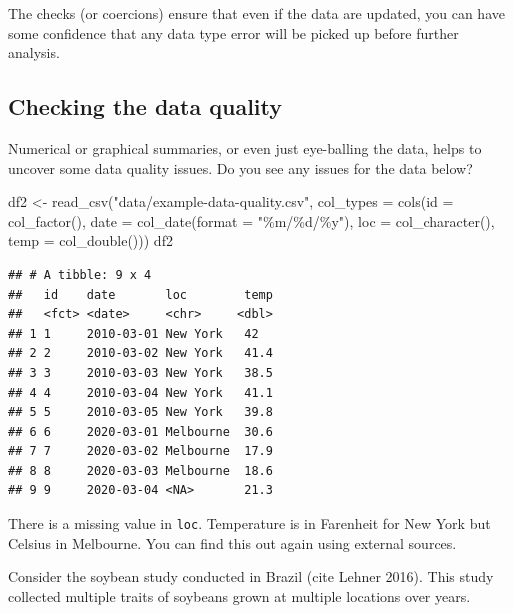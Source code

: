 \documentclass[
]{book}
\newenvironment{Shaded}{\begin{snugshade}}{\end{snugshade}}
\newcommand{\AttributeTok}[1]{\textcolor[rgb]{0.77,0.63,0.00}{#1}}
\newcommand{\FunctionTok}[1]{\textcolor[rgb]{0.00,0.00,0.00}{#1}}
\newcommand{\NormalTok}[1]{#1}
\newcommand{\OtherTok}[1]{\textcolor[rgb]{0.56,0.35,0.01}{#1}}
\newcommand{\StringTok}[1]{\textcolor[rgb]{0.31,0.60,0.02}{#1}}
\begin{document}
The checks (or coercions) ensure that even if the data are updated, you can have some confidence that any data type error will be picked up before further analysis.

\hypertarget{checking-the-data-quality}{%
\subsection{Checking the data quality}\label{checking-the-data-quality}}

Numerical or graphical summaries, or even just eye-balling the data, helps to uncover some data quality issues. Do you see any issues for the data below?

\begin{Shaded}
\begin{Highlighting}[]
\NormalTok{df2 }\OtherTok{\textless{}{-}} \FunctionTok{read\_csv}\NormalTok{(}\StringTok{"data/example{-}data{-}quality.csv"}\NormalTok{,}
                \AttributeTok{col\_types =} \FunctionTok{cols}\NormalTok{(}\AttributeTok{id =} \FunctionTok{col\_factor}\NormalTok{(),}
                                 \AttributeTok{date =} \FunctionTok{col\_date}\NormalTok{(}\AttributeTok{format =} \StringTok{"\%m/\%d/\%y"}\NormalTok{),}
                                 \AttributeTok{loc =} \FunctionTok{col\_character}\NormalTok{(),}
                                 \AttributeTok{temp =} \FunctionTok{col\_double}\NormalTok{()))}
\NormalTok{df2}
\end{Highlighting}
\end{Shaded}

\begin{verbatim}
## # A tibble: 9 x 4
##   id    date       loc        temp
##   <fct> <date>     <chr>     <dbl>
## 1 1     2010-03-01 New York   42  
## 2 2     2010-03-02 New York   41.4
## 3 3     2010-03-03 New York   38.5
## 4 4     2010-03-04 New York   41.1
## 5 5     2010-03-05 New York   39.8
## 6 6     2020-03-01 Melbourne  30.6
## 7 7     2020-03-02 Melbourne  17.9
## 8 8     2020-03-03 Melbourne  18.6
## 9 9     2020-03-04 <NA>       21.3
\end{verbatim}

There is a missing value in \texttt{loc}. Temperature is in Farenheit for New York but Celsius in Melbourne. You can find this out again using external sources.

Consider the soybean study conducted in Brazil (cite Lehner 2016). This study collected multiple traits of soybeans grown at multiple locations over years.
\end{document}
